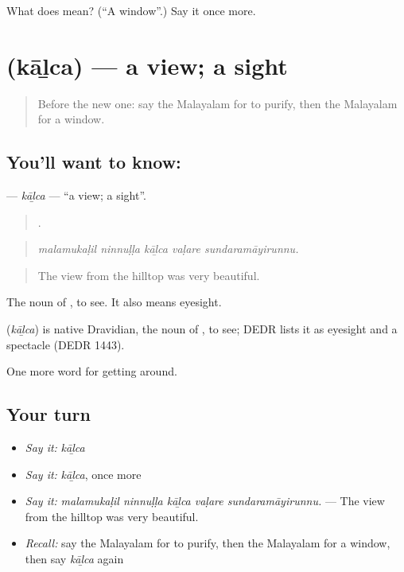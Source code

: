 \begin{tcolorbox}[breakable,colback=teal!4,colframe=teal!35!black,title={Before you move on}]
What does  mean? (\textquotedblleft{}A window\textquotedblright{}.) Say it once more.
\end{tcolorbox}
\section[\texorpdfstring{\ml{കാഴ്ച} (kāḻca)}{കാഴ്ച (kāḻca)}]{ (kāḻca) — a view; a sight}

\label{lesson:ML-C484-kalca}



\begin{quote}
Before the new one: say the Malayalam for to purify, then the Malayalam for a window.
\end{quote}

\subsection*{You'll want to know: }
\textbf{} — \emph{kāḻca} — \textquotedblleft{}a view; a sight\textquotedblright{}.

\begin{quote}
    .
\end{quote}

\begin{quote}
\emph{malamukaḷil ninnuḷḷa kāḻca vaḷare sundaramāyirunnu.}
\end{quote}

\begin{quote}
The view from the hilltop was very beautiful.
\end{quote}

The noun of , to see. It also means eyesight.

\begin{cousinweb}
\textbf{} (\emph{kāḻca}) is native Dravidian, the noun of , to see; DEDR lists it as eyesight and a spectacle (DEDR 1443).
\end{cousinweb}

\begin{grammarlens}[title={What you've built}]
One more word for getting around.
\end{grammarlens}

\subsection*{Your turn}
\begin{itemize}
\raggedright
  \item \emph{Say it:} \emph{kāḻca}
  \item \emph{Say it:} \emph{kāḻca}, once more
  \item \emph{Say it:} \emph{malamukaḷil ninnuḷḷa kāḻca vaḷare sundaramāyirunnu.} — The view from the hilltop was very beautiful.
  \item \emph{Recall:} say the Malayalam for to purify, then the Malayalam for a window, then say \emph{kāḻca} again
\end{itemize}

